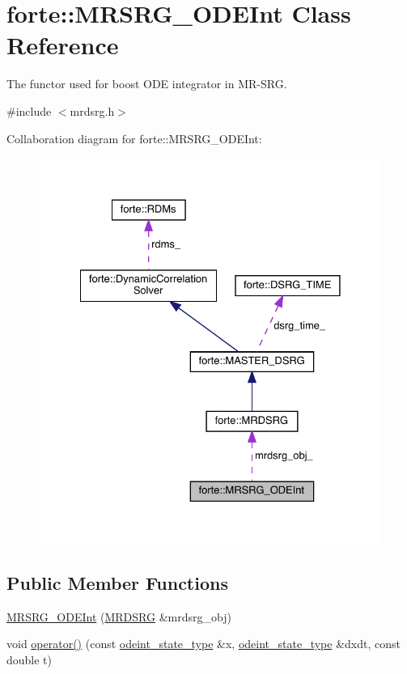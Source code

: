 \hypertarget{classforte_1_1_m_r_s_r_g___o_d_e_int}{}\section{forte\+:\+:M\+R\+S\+R\+G\+\_\+\+O\+D\+E\+Int Class Reference}
\label{classforte_1_1_m_r_s_r_g___o_d_e_int}


The functor used for boost O\+DE integrator in M\+R-\/\+S\+RG.  




{\ttfamily \#include $<$mrdsrg.\+h$>$}



Collaboration diagram for forte\+:\+:M\+R\+S\+R\+G\+\_\+\+O\+D\+E\+Int\+:
\nopagebreak
\begin{figure}[H]
\begin{center}
\leavevmode
\includegraphics[width=328pt]{classforte_1_1_m_r_s_r_g___o_d_e_int__coll__graph}
\end{center}
\end{figure}
\subsection*{Public Member Functions}
\begin{DoxyCompactItemize}
\item 
\mbox{\hyperlink{classforte_1_1_m_r_s_r_g___o_d_e_int_ab1acdac13df425d9d412047a8b8e98a8}{M\+R\+S\+R\+G\+\_\+\+O\+D\+E\+Int}} (\mbox{\hyperlink{classforte_1_1_m_r_d_s_r_g}{M\+R\+D\+S\+RG}} \&mrdsrg\+\_\+obj)
\item 
void \mbox{\hyperlink{classforte_1_1_m_r_s_r_g___o_d_e_int_adce89abf4605df8a639cdbcd1fe5a930}{operator()}} (const \mbox{\hyperlink{namespaceforte_ad8fa2d4b40cee55f959c09c9be68a63e}{odeint\+\_\+state\+\_\+type}} \&x, \mbox{\hyperlink{namespaceforte_ad8fa2d4b40cee55f959c09c9be68a63e}{odeint\+\_\+state\+\_\+type}} \&dxdt, const double t)
\end{DoxyCompactItemize}
